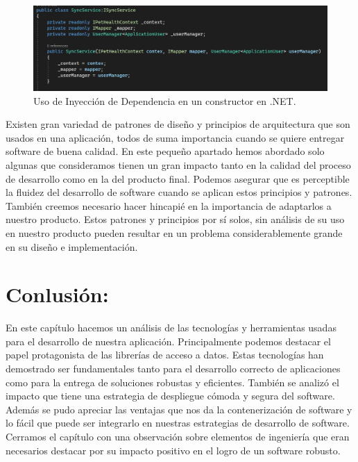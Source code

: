 \begin{figure}[H]
	\centering
	\includegraphics[width = 12cm]{Graphics/dep_inj_example.jpg}
	\caption{Uso de Inyección de Dependencia en un constructor en .NET.}
	\label{fig:di_use_example}
\end{figure}

Existen gran variedad de patrones de diseño y principios de arquitectura que son usados en una aplicación, todos de suma importancia cuando se quiere entregar software de buena calidad. En este pequeño apartado hemos abordado solo algunas que consideramos tienen un gran impacto tanto en la calidad del proceso de desarrollo como en la del producto final. Podemos asegurar que es perceptible la fluidez del desarrollo de software cuando se aplican estos principios y patrones. También creemos necesario hacer hincapié en la importancia de adaptarlos a nuestro producto. Estos patrones y principios por sí solos, sin análisis de su uso en nuestro producto pueden resultar en un problema considerablemente grande en su diseño e implementación.

\section{Conlusión:}
En este capítulo hacemos un análisis de las tecnologías y herramientas usadas para el desarrollo de nuestra aplicación. Principalmente podemos destacar el papel protagonista de las librerías de acceso a datos. Estas tecnologías han demostrado ser fundamentales tanto para el desarrollo correcto de aplicaciones como para la entrega de soluciones robustas y eficientes. También se analizó el impacto que tiene una estrategia de despliegue cómoda y segura del software. Además se pudo apreciar las ventajas que nos da la contenerización de software y lo fácil que puede ser integrarlo en nuestras estrategias de desarrollo de software.  Cerramos el capítulo con una observación sobre elementos de ingeniería que eran necesarios destacar por su impacto positivo en el logro de un software robusto.